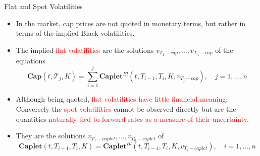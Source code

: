 \documentclass{beamer}
\begin{document}
\begin{frame}{Flat and Spot Volatilities}
\begin{itemize}
	\item<1-> In the market, cap prices are not quoted in monetary terms, but rather in terms of the implied Black volatilities. 
	\item<2-> The implied \textcolor{red}{flat volatilities} are the solutions $v_{T_1-cap},\ldots, v_{T_n-cap}$ of the equations
	\begin{equation*}
		\textbf{Cap}(t, \mathcal{T}_j, K) = \sum_{i=1}^j \textbf{Caplet}^{Bl}(t, T_{i-1}, T_i,K,v_{T_j-cap}),\quad j=1, \ldots,n
	\end{equation*}
	\item<3-> Although being quoted, \textcolor{red}{flat volatilities have little financial meaning}. Conversely the \textcolor{red}{spot volatilities} cannot be observed directly but are the quantities \textcolor{red}{naturally tied to forward rates as a measure of their uncertainty}.	
	\item<4-> They are the solutions $v_{T_1-caplet},\ldots, v_{T_n-caplet}$ of
	\begin{equation*}
		\textbf{Caplet}(t, T_{i-1},T_i,K) = \textbf{Caplet}^{Bl}(t, T_{i-1}, T_i,K,v_{T_i-caplet}),\quad i=1, \ldots,n
	\end{equation*} 
\end{itemize}
\end{frame}
\end{document}
